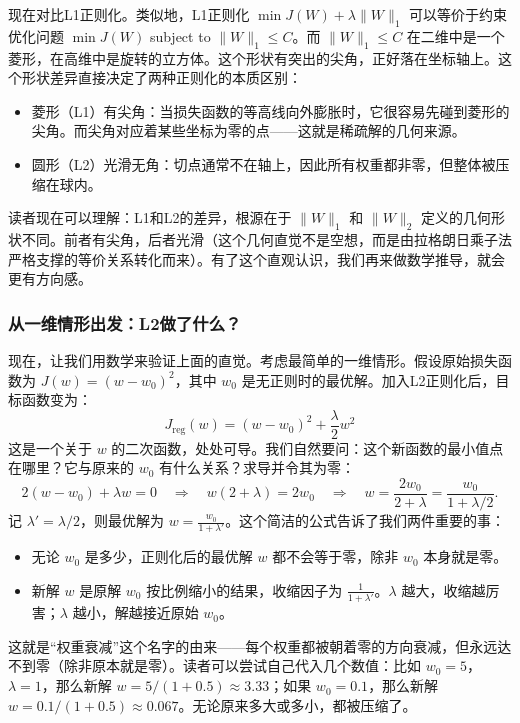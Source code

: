 \documentclass[lang=cn,zihao=-4,a4paper,fontset=windows]{beautybook}
\begin{document}
现在对比L1正则化。类似地，L1正则化 \(\min J(W) + \lambda \|W\|_1\) 可以等价于约束优化问题 \(\min J(W)\) subject to \(\|W\|_1 \le C\)。而 \(\|W\|_1 \le C\) 在二维中是一个菱形，在高维中是旋转的立方体。这个形状有突出的尖角，正好落在坐标轴上。这个形状差异直接决定了两种正则化的本质区别：
\begin{itemize}
\item 菱形（L1）有尖角：当损失函数的等高线向外膨胀时，它很容易先碰到菱形的尖角。而尖角对应着某些坐标为零的点——这就是稀疏解的几何来源。
\item 圆形（L2）光滑无角：切点通常不在轴上，因此所有权重都非零，但整体被压缩在球内。
\end{itemize}
读者现在可以理解：L1和L2的差异，根源在于 \(\|W\|_1\) 和 \(\|W\|_2\) 定义的几何形状不同。前者有尖角，后者光滑（这个几何直觉不是空想，而是由拉格朗日乘子法严格支撑的等价关系转化而来）。有了这个直观认识，我们再来做数学推导，就会更有方向感。

\subsubsection*{从一维情形出发：L2做了什么？}

现在，让我们用数学来验证上面的直觉。考虑最简单的一维情形。假设原始损失函数为 \(J(w) = (w - w_0)^2\)，其中 \(w_0\) 是无正则时的最优解。加入L2正则化后，目标函数变为：
\[
J_{\text{reg}}(w) = (w - w_0)^2 + \frac{\lambda}{2} w^2
\]
这是一个关于 \(w\) 的二次函数，处处可导。我们自然要问：这个新函数的最小值点在哪里？它与原来的 \(w_0\) 有什么关系？求导并令其为零：
\[
2(w - w_0) + \lambda w = 0 \quad \Rightarrow \quad w(2 + \lambda) = 2w_0 \quad \Rightarrow \quad w = \frac{2w_0}{2 + \lambda} = \frac{w_0}{1 + \lambda/2}.
\]
记 \(\lambda' = \lambda/2\)，则最优解为 \(w = \frac{w_0}{1 + \lambda'}\)。这个简洁的公式告诉了我们两件重要的事：
\begin{itemize}
\item 无论 \(w_0\) 是多少，正则化后的最优解 \(w\) 都不会等于零，除非 \(w_0\) 本身就是零。
\item 新解 \(w\) 是原解 \(w_0\) 按比例缩小的结果，收缩因子为 \(\frac{1}{1 + \lambda'}\)。\(\lambda\) 越大，收缩越厉害；\(\lambda\) 越小，解越接近原始 \(w_0\)。
\end{itemize}
这就是“权重衰减”这个名字的由来——每个权重都被朝着零的方向衰减，但永远达不到零（除非原本就是零）。读者可以尝试自己代入几个数值：比如 \(w_0 = 5\)，\(\lambda = 1\)，那么新解 \(w = 5/(1+0.5) \approx 3.33\)；如果 \(w_0 = 0.1\)，那么新解 \(w = 0.1/(1+0.5) \approx 0.067\)。无论原来多大或多小，都被压缩了。
\end{document}
